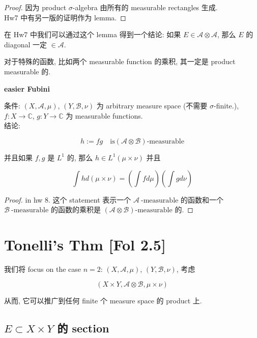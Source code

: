 \documentclass{qlnotes-export}
\begin{document}
\begin{proof}

因为 product \(\sigma\)-algebra 由所有的 measurable rectangles 生成.\\
Hw7 中有另一版的证明作为 lemma.

\end{proof}

在 Hw7 中我们可以通过这个 lemma 得到一个结论: 如果 \(E \in \mathcal{A} \otimes \mathcal{A}\), 那么 \(E\) 的 diagonal 一定 \(\in \mathcal{A}\).

对于特殊的函数, 比如两个 measurable function 的乘积, 其一定是 product measurable 的.

\begin{lemma}{\protect{}\label{kn-easier-fubini}{\textbf{easier Fubini}}}

条件: \((X,\mathcal{A},\mu)\), \((Y,\mathcal{B},\nu)\) 为 arbitrary measure space (不需要 \(\sigma\)-finite.), \(f:X\rightarrow{\mathbb{C}}\), \(g:Y\rightarrow{\mathbb{C}}\) 为 measurable functions.\\
结论:

\[h := fg\quad\text{is}(\mathcal{A} \otimes \mathcal{B})\text{-measurable}\]

并且如果 \(f,g\) 是 \(L^{1}\) 的, 那么 \(h \in L^{1}(\mu \times \nu)\) 并且

\[\int h d(\mu \times \nu) = (\int f d\mu)(\int g d\nu)\]

\end{lemma}

\begin{proof}

in hw 8. 这个 statement 表示一个 \(\mathcal{A}\ \text{-measurable}\) 的函数和一个 \(\mathcal{B}\ \text{-measurable}\) 的函数的乘积是 \((\mathcal{A} \otimes \mathcal{B})\text{-measurable}\) 的.

\end{proof}

\section{Tonelli's Thm {[}Fol 2.5{]}}

我们将 focus on the case \(n = 2\): \((X,\mathcal{A},\mu)\), \((Y,\mathcal{B},\nu)\), 考虑

\[(X \times Y,\mathcal{A} \otimes \mathcal{B},\mu \times \nu)\]

从而, 它可以推广到任何 finite 个 measure space 的 product 上.

\subsection{\texorpdfstring{\(E \subset X \times Y\) 的 section}{E \textbackslash subset X \textbackslash times Y 的 section}}\label{e-subset-x-times-y-ux7684-section}
\end{document}
